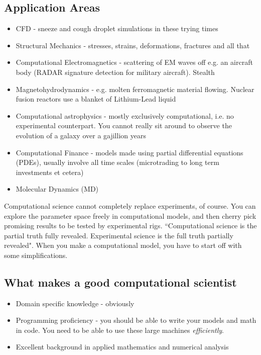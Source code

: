 \documentclass[a4paper]{article}
\begin{document}
\subsection*{Application Areas}
\begin{itemize}
	\item CFD - sneeze and cough droplet simulations in these trying times
	\item Structural Mechanics - stresses, strains, deformations, fractures and all that
	\item Computational Electromagnetics - scattering of EM waves off e.g. an aircraft body (RADAR signature detection for military aircraft). Stealth
	\item Magnetohydrodynamics - e.g. molten ferromagnetic material flowing. Nuclear fusion reactors use a blanket of Lithium-Lead liquid
	\item Computational astrophysics - mostly exclusively computational, i.e. no experimental counterpart. You cannot really sit around to observe the evolution of a galaxy over a gajillion years
	\item Computational Finance - models made using partial differential equations (PDEs), usually involve all time scales (microtrading to long term investments et cetera)
	\item Molecular Dynamics (MD)
\end{itemize}

Computational science cannot completely replace experiments, of course.
You can explore the parameter space freely in computational models, and
then cherry pick promising results to be tested by experimental rigs.
``Computational science is the partial truth fully revealed. Experimental
science is the full truth partially revealed". When you make a computational
model, you have to start off with some simplifications.

\subsection*{What makes a good computational scientist}
\begin{itemize}
	\item Domain specific knowledge - obviously
	\item Programming proficiency - you should be able to write your models and math in code. You need to be able to use these large
		machines \emph{efficiently}.
	\item Excellent background in applied mathematics and numerical analysis
\end{itemize}
\end{document}
